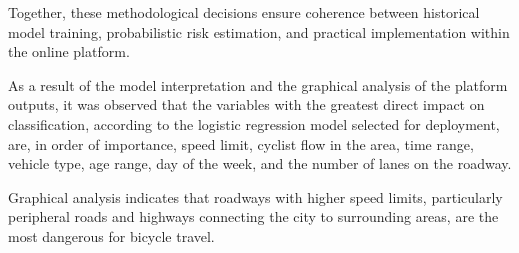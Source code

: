 \documentclass[preprint,12pt]{elsarticle}
\begin{document}
Together, these methodological decisions ensure coherence between historical model training, probabilistic risk estimation, and practical implementation within the online platform.

As a result of the model interpretation and the graphical analysis of the platform outputs, it was observed that the variables with the greatest direct impact on classification, according to the logistic regression model selected for deployment, are, in order of importance, speed limit, cyclist flow in the area, time range, vehicle type, age range, day of the week, and the number of lanes on the roadway.

Graphical analysis indicates that roadways with higher speed limits, particularly peripheral roads and highways connecting the city to surrounding areas, are the most dangerous for bicycle travel.













\end{document}
